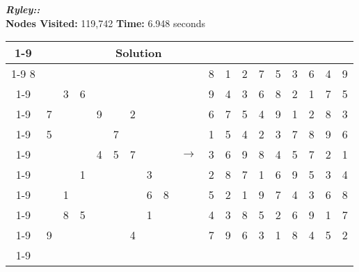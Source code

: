 \documentclass{article}
\begin{document}
\small\emph{\textbf{Ryley::}}\\ \textbf{Nodes Visited:} 119,742 \textbf{Time:} 6.948 seconds\\
\begin{tabular}{||c|c|c||c|c|c||c|c|c|| c ||c|c|c||c|c|c||c|c|c||}
  \cmidrule{1-9} \cmidrule{11-19}
  \multicolumn{9}{|c|}{Problem} &                   & \multicolumn{9}{|c|}{Solution}   \\\cmidrule{1-9} \cmidrule{11-19} \morecmidrules \cmidrule{1-9} \cmidrule{11-19}
8 &   &   &   &   &   &   &   &   &  & 8 & 1 & 2 & 7 & 5 & 3 & 6 & 4 & 9\\\cmidrule{1-9} \cmidrule{11-19}
  &   & 3 & 6 &   &   &   &   &   &  & 9 & 4 & 3 & 6 & 8 & 2 & 1 & 7 & 5\\\cmidrule{1-9} \cmidrule{11-19}
  & 7 &   &   & 9 &   & 2 &   &   &  & 6 & 7 & 5 & 4 & 9 & 1 & 2 & 8 & 3\\\cmidrule{1-9} \cmidrule{11-19} \morecmidrules \cmidrule{1-9} \cmidrule{11-19}
  & 5 &   &   &   & 7 &   &   &   &  & 1 & 5 & 4 & 2 & 3 & 7 & 8 & 9 & 6\\\cmidrule{1-9} \cmidrule{11-19}
  &   &   &   & 4 & 5 & 7 &   &   & $\rightarrow$ & 3 & 6 & 9 & 8 & 4 & 5 & 7 & 2 & 1\\\cmidrule{1-9} \cmidrule{11-19}
  &   &   & 1 &   &   &   & 3 &   &  & 2 & 8 & 7 & 1 & 6 & 9 & 5 & 3 & 4\\\cmidrule{1-9} \cmidrule{11-19} \morecmidrules \cmidrule{1-9} \cmidrule{11-19}
  &   & 1 &   &   &   &   & 6 & 8 &  & 5 & 2 & 1 & 9 & 7 & 4 & 3 & 6 & 8\\\cmidrule{1-9} \cmidrule{11-19}
  &   & 8 & 5 &   &   &   & 1 &   &  & 4 & 3 & 8 & 5 & 2 & 6 & 9 & 1 & 7\\\cmidrule{1-9} \cmidrule{11-19}
  & 9 &   &   &   &   & 4 &   &   &  & 7 & 9 & 6 & 3 & 1 & 8 & 4 & 5 & 2\\\cmidrule{1-9} \cmidrule{11-19} \morecmidrules \cmidrule{1-9} \cmidrule{11-19}

 \end{tabular}
\\
\end{document}
